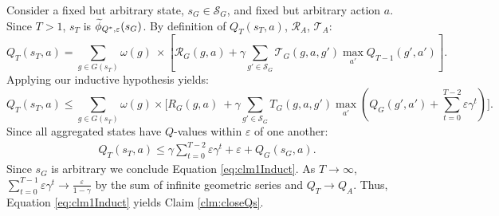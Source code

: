 Consider a fixed but arbitrary state, $s_G \in \mathcal{S}_G$, and fixed but arbitrary action $a$.
Since $T > 1$, $s_T$ is $\widetilde \phi_{Q^*,\varepsilon}(s_G)$.
By definition of $Q_{T}(s_T, a)$, $\mathcal{R}_A$, $\mathcal{T}_A$:
\[
Q_T(s_T, a) = \sum_{g \in G(s_T)}\omega(g)\ \times \left[ \mathcal{R}_G(g,a) + \gamma \sum_{g' \in \mathcal{S}_G} \mathcal{T}_G(g,a,g') \max_{a'} Q_{T-1}(g', a')      \right].
\]
Applying our inductive hypothesis yields:
\[
Q_T(s_T, a) \leq \sum_{g \in G(s_T)}\omega(g) \times \biggl[ R_G(g,a)\ + \gamma \sum_{g' \in \mathcal{S}_G} T_G(g,a,g') \max_{a'}(Q_G(g', a') + \sum_{t=0}^{T-2} \varepsilon \gamma^t) \biggr].
\]
Since all aggregated states have $Q$-values within $\varepsilon$ of one another:
\begin{align*}
Q_T(s_T, a) \leq \gamma\sum_{t=0}^{T-2} \varepsilon \gamma^t + \varepsilon + Q_G(s_G, a).
\end{align*}
Since $s_G$ is arbitrary we conclude Equation \ref{eq:clm1Induct}. As $T \rightarrow \infty$, $\sum_{t=0}^{T-1} \varepsilon \gamma^t \rightarrow \frac{\varepsilon}{1-\gamma}$ by the sum of infinite geometric series and $Q_T \rightarrow Q_A$. Thus, Equation \ref{eq:clm1Induct} yields Claim \ref{clm:closeQs}.

